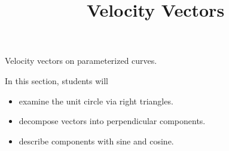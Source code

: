 \documentclass{ximera}
\title{Velocity Vectors}
\begin{document}
\begin{abstract}
\end{abstract}
\maketitle





Velocity vectors on parameterized curves.







\begin{sectionOutcomes}
In this section, students will 

\begin{itemize}
\item examine the unit circle via right triangles.
\item decompose vectors into perpendicular components.
\item describe components with sine and cosine.
\end{itemize}
\end{sectionOutcomes}
\end{document}
